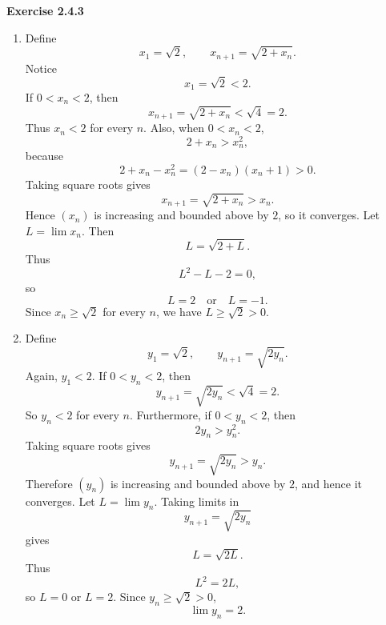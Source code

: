 \documentclass[12pt]{article}
\begin{document}
\noindent{} \textbf{Exercise 2.4.3}
\begin{enumerate}
    \item [(a)] Define
          \[
              x_1=\sqrt2,
              \qquad
              x_{n+1}=\sqrt{2+x_n}.
          \]
          Notice
          \[
              x_1=\sqrt2<2.
          \]If \(0<x_n<2\), then
          \[
              x_{n+1}=\sqrt{2+x_n}<\sqrt4=2.
          \]Thus \(x_n<2\) for every \(n\). Also, when \(0<x_n<2\),
          \[
              2+x_n>x_n^2,
          \]because
          \[
              2+x_n-x_n^2=(2-x_n)(x_n+1)>0.
          \]Taking square roots gives
          \[
              x_{n+1}=\sqrt{2+x_n}>x_n.
          \]Hence \((x_n)\) is increasing and bounded above by \(2\), so it converges.
          Let \(L=\lim x_n\). Then
          \[
              L=\sqrt{2+L}.
          \]Thus
          \[
              L^2-L-2=0,
          \]so
          \[
              L=2 \quad\text{or}\quad L=-1.
          \]Since \(x_n\ge\sqrt2\) for every \(n\), we have \(L\ge\sqrt2>0\).
    \item [(b)]
          Define
          \[
              y_1=\sqrt2,
              \qquad
              y_{n+1}=\sqrt{2y_n}.
          \]Again, \(y_1<2\). If \(0<y_n<2\), then
          \[
              y_{n+1}=\sqrt{2y_n}<\sqrt4=2.
          \]So \(y_n<2\) for every \(n\). Furthermore, if \(0<y_n<2\), then
          \[
              2y_n>y_n^2.
          \]Taking square roots gives
          \[
              y_{n+1}=\sqrt{2y_n}>y_n.
          \]Therefore \((y_n)\) is increasing and bounded above by \(2\), and hence it converges.
          Let \(L=\lim y_n\). Taking limits in
          \[
              y_{n+1}=\sqrt{2y_n}
          \]gives
          \[
              L=\sqrt{2L}.
          \]Thus
          \[
              L^2=2L,
          \]so \(L=0\) or \(L=2\). Since \(y_n\ge\sqrt2>0\),
          \[
              \lim y_n=2.
          \]
\end{enumerate}
\end{document}
